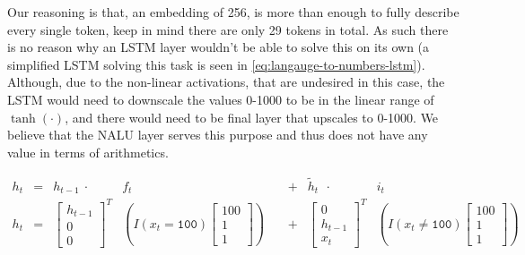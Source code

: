 Our reasoning is that, an embedding of 256, is more than enough to fully describe every single token, keep in mind there are only 29 tokens in total. As such there is no reason why an LSTM layer wouldn't be able to solve this on its own (a simplified LSTM solving this task is seen in \eqref{eq:langauge-to-numbers-lstm}). Although, due to the non-linear activations, that are undesired in this case, the LSTM would need to downscale the values 0-1000 to be in the linear range of $\tanh(\cdot)$, and there would need to be final layer that upscales to 0-1000. We believe that the NALU layer serves this purpose and thus does not have any value in terms of arithmetics.

\begin{equation}
\begin{aligned}
h_t &= &h_{t-1}\ \cdot\ &f_t &&+ &\tilde{h}_{t}\ \ \cdot\ &i_t \\
h_t &= &\begin{bmatrix}
 h_{t-1} \\
 0 \\
 0
\end{bmatrix}^T &\left(I(x_t = \texttt{100})\begin{bmatrix}100 \\ 1 \\ 1\end{bmatrix}\right)\ &&+ &\begin{bmatrix}
 0 \\
 h_{t-1} \\
 x_t
\end{bmatrix}^T &\left(I(x_t \not= \texttt{100})\begin{bmatrix}100 \\ 1 \\ 1\end{bmatrix}\right)
\end{aligned}
\label{eq:langauge-to-numbers-lstm}
\end{equation}
